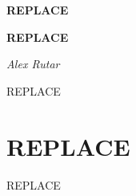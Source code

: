 \documentclass[12pt, a4paper]{book}
\theoremstyle{nonumberplain}
\newcommand{\subject}{REPLACE}
\newcommand{\topic}{REPLACE}
\newcommand{\semester}{REPLACE}
\begin{document}
\begin{titlepage}
    \centering
    \vspace{5cm}
    {\huge\textbf{\subject}\par} %
    \vspace{2cm}
    {\Large\textbf{\topic}\par} %
    \vspace{3cm}
    {\Large\textit{Alex Rutar}\par}

    \vfill

    {\large \semester \par} %
\end{titlepage}
\tableofcontents\thispagestyle{updated}
\chapter{REPLACE}
REPLACE
\end{document}

